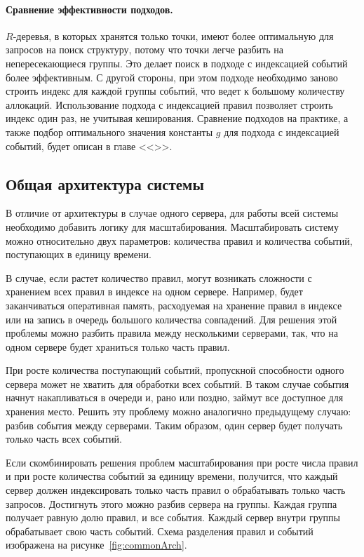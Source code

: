 \documentclass[14pt]{article}
\begin{document}
\paragraph{Сравнение эффективности подходов.} $R$-деревья, в которых хранятся только точки, имеют более оптимальную для запросов на поиск структуру, потому что точки легче разбить на непересекающиеся группы. Это делает поиск в подходе с индексацией событий более эффективным. С другой стороны, при этом подходе необходимо заново строить индекс для каждой группы событий, что ведет к большому количеству аллокаций. Использование подхода с индексацией правил позволяет строить индекс один раз, не учитывая кеширования. Сравнение подходов на практике, а также подбор оптимального значения константы $g$ для подхода с индексацией событий, будет описан в главе <<>>.

\subsection{Общая архитектура системы}
\label{section:commonArch}
В отличие от архитектуры в случае одного сервера, для работы всей системы необходимо добавить логику для масштабирования. Масштабировать систему можно относительно двух параметров: количества правил и количества событий, поступающих в единицу времени.

В случае, если растет количество правил, могут возникать сложности с хранением всех правил в индексе на одном сервере. Например, будет заканчиваться оперативная память, расходуемая на хранение правил в индексе или на запись в очередь большого количества совпадений. Для решения этой проблемы можно разбить правила между несколькими серверами, так, что на одном сервере будет храниться только часть правил.

При росте количества поступающий событий, пропускной способности одного сервера может не хватить для обработки всех событий. В таком случае события начнут накапливаться в очереди и, рано или поздно, займут все доступное для хранения место. Решить эту проблему можно аналогично предыдущему случаю: разбив события между серверами. Таким образом, один сервер будет получать только часть всех событий.

Если скомбинировать решения проблем масштабирования при росте числа правил и при росте количества событий за единицу времени, получится, что каждый сервер должен индексировать только часть правил о обрабатывать только часть запросов. Достигнуть этого можно разбив сервера на группы. Каждая группа получает равную долю правил, и все события. Каждый сервер внутри группы обрабатывает свою часть событий. Схема разделения правил и событий изображена на рисунке~\ref{fig:commonArch}.
\end{document}
